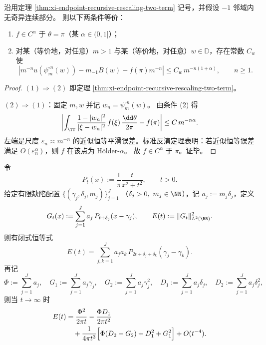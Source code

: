 \begin{proposition}\label{prop:xi-endpoint-recursive-error-holder-equivalence}
沿用定理 \ref{thm:xi-endpoint-recursive-rescaling-two-term} 记号，并假设 \(-1\) 邻域内无奇异连续部分。
则以下两条件等价：
\begin{enumerate}
  \item \(f\in C^\alpha\) 于 \(\theta=\pi\)（某 \(\alpha\in(0,1]\)）；
  \item 对某（等价地，对任意）\(m>1\) 与某（等价地，对任意）\(w\in\mathbb D\)，存在常数 \(C_w\) 使
  \[
  \left|
  m^{-n}u\!\left(\psi_m^{\circ n}(w)\right)
  -m_{-1}B(w)-f(\pi)m^{-n}
  \right|
  \le C_w\,m^{-n(1+\alpha)},\qquad n\ge 1.
  \]
\end{enumerate}
\end{proposition}

\begin{proof}
\((1)\Rightarrow(2)\) 即定理 \ref{thm:xi-endpoint-recursive-rescaling-two-term}。

\((2)\Rightarrow(1)\)：固定 \(m,w\) 并记 \(w_n=\psi_m^{\circ n}(w)\)。
由条件 (2) 得
\[
\left|
\int_{\TT}\frac{1-|w_n|^2}{|\xi-w_n|^2}\,f(\xi)\,\frac{\dd\theta}{2\pi}
-f(\pi)
\right|
\le C\,m^{-n\alpha}.
\]
左端是尺度 \(\varepsilon_n\asymp m^{-n}\) 的近似恒等平滑误差。标准反演定理表明：若近似恒等误差满足
\(
O(\varepsilon_n^\alpha)
\)，则 \(f\) 在该点为 Hölder-\(\alpha\)。
故 \(f\in C^\alpha\) 于 \(\pi\)。证毕。
\end{proof}

\begin{theorem}\label{thm:xi-poisson-defect-l2-energy-closed-form-three-term}
令
\[
P_t(x):=\frac{1}{\pi}\frac{t}{x^2+t^2},\qquad t>0.
\]
给定有限缺陷配置
\(
\{(\gamma_j,\delta_j,m_j)\}_{j=1}^J
\)
（\(\delta_j>0,\ m_j\in\NN\)），记
\(
a_j:=m_j\delta_j
\)，定义
\[
G_t(x):=\sum_{j=1}^J a_j\,P_{t+\delta_j}(x-\gamma_j),
\qquad
E(t):=\|G_t\|_{L^2(\RR)}^2.
\]
则有闭式恒等式
\begin{equation}\label{eq:xi-poisson-defect-l2-energy-closed-form}
E(t)=\sum_{j,k=1}^J a_j a_k\,P_{2t+\delta_j+\delta_k}(\gamma_j-\gamma_k).
\end{equation}
再记
\[
\Phi:=\sum_{j=1}^J a_j,\quad
G_1:=\sum_{j=1}^J a_j\gamma_j,\quad
G_2:=\sum_{j=1}^J a_j\gamma_j^2,\quad
D_1:=\sum_{j=1}^J a_j\delta_j,\quad
D_2:=\sum_{j=1}^J a_j\delta_j^2,
\]
则当 \(t\to\infty\) 时
\begin{equation}\label{eq:xi-poisson-defect-l2-energy-three-term-expansion}
\begin{aligned}
E(t)
&=\frac{\Phi^2}{2\pi t}
-\frac{\Phi D_1}{2\pi t^2}\\
&\quad+\frac{1}{4\pi t^3}\Bigl[\Phi(D_2-G_2)+D_1^2+G_1^2\Bigr]
+O(t^{-4}).
\end{aligned}
\end{equation}
\end{theorem}

